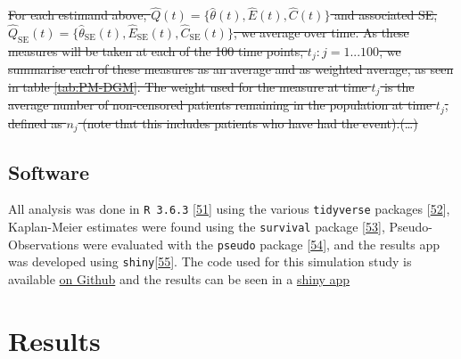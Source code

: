 \documentclass[12pt,PhD,twoside,openright]{muthesis}
\begin{document}
\sout{For each estimand above, \(\hat{Q}(t) = \{\hat{\theta}(t),\hat{E}(t), \hat{C}(t)\}\) and associated SE, \(\hat{Q}_\textrm{SE}(t) = \{\hat{\theta}_\textrm{SE}(t),\hat{E}_\textrm{SE}(t), \hat{C}_\textrm{SE}(t)\}\), we average over time. As these measures will be taken at each of the 100 time points, \(t_j:j=1...100\), we summarise each of these measures as an average and as weighted average, as seen in table \ref{tab:PM-DGM}. The weight used for the measure at time \(t_j\) is the average number of non-censored patients remaining in the population at time \(t_j\), defined as \(n_j\) (note that this includes patients who have had the event).(\ldots)}

\hypertarget{software}{%
\subsection{Software}\label{software}}

All analysis was done in \texttt{R\ 3.6.3} {[}\protect\hyperlink{ref-r_core_team_r_nodate}{51}{]} using the various \texttt{tidyverse} packages {[}\protect\hyperlink{ref-wickham_tidy_2017}{52}{]}, Kaplan-Meier estimates were found using the \texttt{survival} package {[}\protect\hyperlink{ref-therneau_package_2020}{53}{]}, Pseudo-Observations were evaluated with the \texttt{pseudo} package {[}\protect\hyperlink{ref-perme_pseudo_2017}{54}{]}, and the results app was developed using \texttt{shiny}{[}\protect\hyperlink{ref-chang_shiny_2020}{55}{]}. The code used for this simulation study is available \href{https://github.com/MyKo101/IPCW-Logistic}{on Github} and the results can be seen in a \href{https://michael-barrowman.shinyapps.io/IPCW_Calibrations/?_ga=2.129261196.1072091615.1588464259-38998367.1584541320}{shiny app}

\hypertarget{results-3}{%
\section{Results}\label{results-3}}
\end{document}
